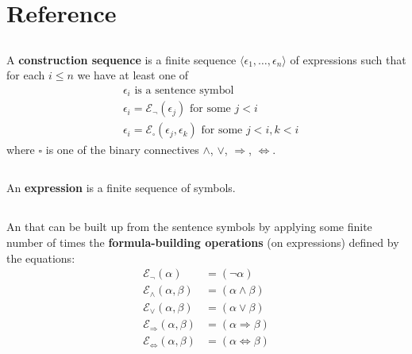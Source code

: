 \documentclass{report}
\begin{document}

\tableofcontents

\begingroup
\renewcommand\thechapter{R}

\chapter{Reference}%

\section{}%

A \textbf{construction sequence} is a finite sequence
  $\langle \epsilon_1, \ldots, \epsilon_n \rangle$ of expressions such that for
  each $i \leq n$ we have at least one of
  \begin{align*}
    & \epsilon_i \text{ is a sentence symbol} \\
    & \epsilon_i = \mathcal{E}_\neg(\epsilon_j) \text{ for some } j < i \\
    & \epsilon_i = \mathcal{E}_\square(\epsilon_j, \epsilon_k)
      \text{ for some } j < i, k < i
  \end{align*}
  where $\square$ is one of the binary connectives $\land$, $\lor$,
    $\Rightarrow$, $\Leftrightarrow$.

\section{}%

An \textbf{expression} is a finite sequence of symbols.

\section{}%

An  that can be built up from the sentence symbols by
  applying some finite number of times the \textbf{formula-building operations}
  (on expressions) defined by the equations:
  \begin{align*}
    \mathcal{E}_{\neg}(\alpha)
      & = (\neg \alpha) \\
    \mathcal{E}_{\land}(\alpha, \beta)
      & = (\alpha \land \beta) \\
    \mathcal{E}_{\lor}(\alpha, \beta)
      & = (\alpha \lor \beta) \\
    \mathcal{E}_{\Rightarrow}(\alpha, \beta)
      & = (\alpha \Rightarrow \beta) \\
    \mathcal{E}_{\Leftrightarrow}(\alpha, \beta)
      & = (\alpha \Leftrightarrow \beta)
  \end{align*}
\end{document}
